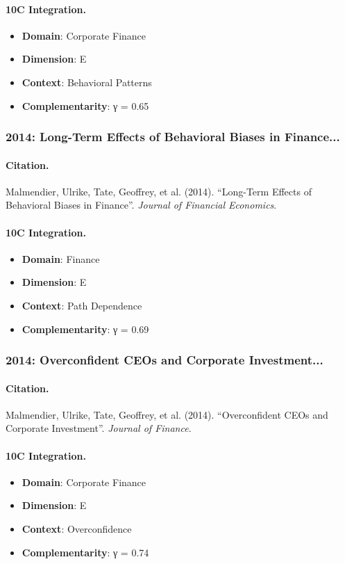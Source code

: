 \paragraph{10C Integration.}
\begin{itemize}[nosep]
  \item \textbf{Domain}: Corporate Finance
  \item \textbf{Dimension}: E
  \item \textbf{Context}: Behavioral Patterns
  \item \textbf{Complementarity}: γ = 0.65
\end{itemize}


\subsubsection{2014: Long-Term Effects of Behavioral Biases in Finance...}

\paragraph{Citation.}
Malmendier, Ulrike, Tate, Geoffrey, et al. (2014). ``Long-Term Effects of Behavioral Biases in Finance''. \textit{Journal of Financial Economics}.

\paragraph{10C Integration.}
\begin{itemize}[nosep]
  \item \textbf{Domain}: Finance
  \item \textbf{Dimension}: E
  \item \textbf{Context}: Path Dependence
  \item \textbf{Complementarity}: γ = 0.69
\end{itemize}


\subsubsection{2014: Overconfident CEOs and Corporate Investment...}

\paragraph{Citation.}
Malmendier, Ulrike, Tate, Geoffrey, et al. (2014). ``Overconfident CEOs and Corporate Investment''. \textit{Journal of Finance}.

\paragraph{10C Integration.}
\begin{itemize}[nosep]
  \item \textbf{Domain}: Corporate Finance
  \item \textbf{Dimension}: E
  \item \textbf{Context}: Overconfidence
  \item \textbf{Complementarity}: γ = 0.74
\end{itemize}


